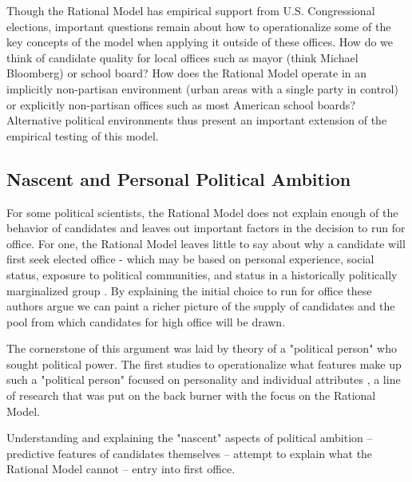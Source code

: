 Though the Rational Model has empirical support from U.S. Congressional elections, 
important questions remain about how to operationalize some of the key concepts of 
the model when applying it outside of these offices. How do we think of candidate 
quality for local offices such as mayor (think Michael Bloomberg) or school board? 
How does the Rational Model operate in an implicitly non-partisan environment (urban 
areas with a single party in control) or explicitly non-partisan offices such as 
most American school boards? Alternative political environments thus present an 
important extension of the empirical testing of this model. 

\subsection{Nascent and Personal Political Ambition}

For some political scientists, the Rational Model does not explain enough of the 
behavior of candidates and leaves out important factors in the decision to run 
for office. For one, the Rational Model leaves little to say about why a candidate 
will first seek elected office - which may be based on personal experience, 
social status, exposure to political communities, and status in a historically 
politically marginalized group \citep{AJPS:AJPS147}. By explaining the initial 
choice to run for office these authors argue we can paint a richer picture of the 
supply of candidates and the pool from which candidates for high office will be drawn. 

The cornerstone of this argument was laid by \citet{Lasswell} theory of a 
"political person" who sought political power. The first studies to operationalize 
what features make up such a "political person" focused on personality and individual 
attributes \citep{barber1, fishel1}, a line of research that was put on the back 
burner with the focus on the Rational Model. 

Understanding 
and explaining the "nascent" aspects of political ambition -- predictive features of 
candidates themselves -- \citet{AJPS:AJPS147} attempt to explain what the Rational Model 
cannot -- entry into first office. 


